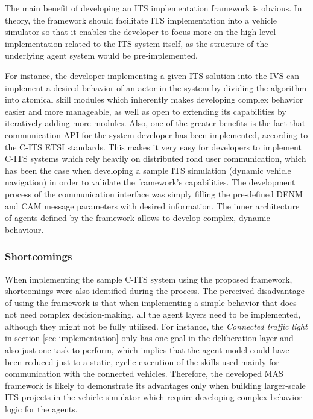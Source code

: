 \documentclass[0main.tex]{subfiles}
\begin{document}
The main benefit of developing an ITS implementation framework is obvious. In theory,
the framework should facilitate ITS implementation into a vehicle simulator so that it enables
the developer to focus more on the high-level implementation related to the ITS system itself,
as the structure of the underlying agent system would be pre-implemented. 

For instance, the developer implementing a given ITS solution into the IVS can implement a
desired behavior of an actor in the system by dividing the algorithm into atomical skill
modules which inherently makes developing complex behavior easier and more manageable, as well
as open to extending its capabilities by iteratively adding more modules. Also, one of the
greater benefits is the fact that communication API  for the system developer has been
implemented, according to the C-ITS ETSI standards. This makes it very easy for developers to
implement C-ITS systems which rely heavily on distributed road user communication, which has
been the case when developing a sample ITS simulation (dynamic vehicle navigation) in order to
validate the framework's capabilities. The development process of the communication interface
was simply filling the pre-defined DENM and CAM message parameters with desired information.
The inner architecture of agents defined by the framework allows to develop complex, dynamic
behaviour.

\subsubsection{Shortcomings}

When implementing the sample C-ITS system using the proposed framework, shortcomings were also
identified during the process. The perceived disadvantage of using the framework is that when
implementing a simple behavior that does not need complex decision-making, all the agent layers
need to be implemented, although they might not be fully utilized. For instance, the
\emph{Connected traffic light} in section \ref{sec-implementation} only has one goal in the
deliberation layer and also just one task to perform, which implies that the agent model could
have been reduced just to a static, cyclic execution of the skills used mainly for
communication with the connected vehicles. Therefore, the developed MAS framework is likely to
demonstrate its advantages only when building larger-scale ITS projects in the vehicle
simulator which require developing complex behavior logic for the agents. 
\end{document}
